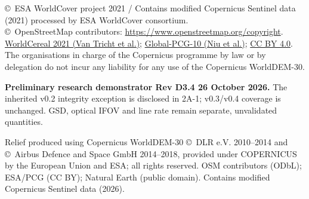 \documentclass[10pt,a4paper]{article}
\begin{document}
\vfill
{\fontsize{6.3}{8}\selectfont\color{atlasgray}\copyright\ ESA WorldCover project 2021 / Contains modified Copernicus Sentinel data (2021) processed by ESA WorldCover consortium.\\\copyright\ OpenStreetMap contributors: \url{https://www.openstreetmap.org/copyright}. \href{https://doi.org/10.5281/zenodo.7875105}{WorldCereal 2021 (Van Tricht et al.)}; \href{https://doi.org/10.6084/m9.figshare.27731148.v2}{Global-PCG-10 (Niu et al.)}; \href{https://creativecommons.org/licenses/by/4.0/}{CC BY 4.0}.\\The organisations in charge of the Copernicus programme by law or by delegation do not incur any liability for any use of the Copernicus WorldDEM-30.\par}

{\fontsize{6.3}{8}\selectfont\color{atlasgray}\textbf{Preliminary research demonstrator \textbar{} Rev D3.4 \textbar{} 26 October 2026.} The inherited v0.2 integrity exception is disclosed in 2A-1; v0.3/v0.4 coverage is unchanged. GSD, optical IFOV and line rate remain separate, unvalidated quantities.\par
Relief produced using Copernicus WorldDEM-30 \copyright\ DLR e.V. 2010--2014 and \copyright\ Airbus Defence and Space GmbH 2014--2018, provided under COPERNICUS by the European Union and ESA; all rights reserved. OSM contributors (ODbL); ESA/PCG (CC BY); Natural Earth (public domain). Contains modified Copernicus Sentinel data (2026).\par}
\end{document}

